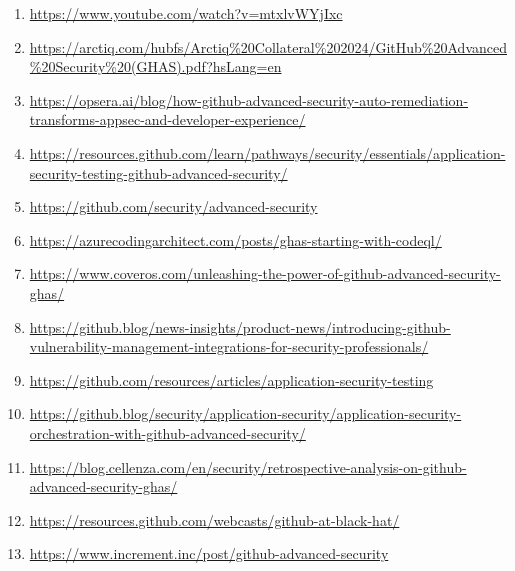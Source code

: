 \documentclass[11pt]{article}
\begin{document}
\begin{enumerate}[leftmargin=*]
  \item \url{https://www.youtube.com/watch?v=mtxlvWYjIxc}
  \item \url{https://arctiq.com/hubfs/Arctiq%20Collateral%202024/GitHub%20Advanced%20Security%20(GHAS).pdf?hsLang=en}
  \item \url{https://opsera.ai/blog/how-github-advanced-security-auto-remediation-transforms-appsec-and-developer-experience/}
  \item \url{https://resources.github.com/learn/pathways/security/essentials/application-security-testing-github-advanced-security/}
  \item \url{https://github.com/security/advanced-security}
  \item \url{https://azurecodingarchitect.com/posts/ghas-starting-with-codeql/}
  \item \url{https://www.coveros.com/unleashing-the-power-of-github-advanced-security-ghas/}
  \item \url{https://github.blog/news-insights/product-news/introducing-github-vulnerability-management-integrations-for-security-professionals/}
  \item \url{https://github.com/resources/articles/application-security-testing}
  \item \url{https://github.blog/security/application-security/application-security-orchestration-with-github-advanced-security/}
  \item \url{https://blog.cellenza.com/en/security/retrospective-analysis-on-github-advanced-security-ghas/}
  \item \url{https://resources.github.com/webcasts/github-at-black-hat/}
  \item \url{https://www.increment.inc/post/github-advanced-security}
\end{enumerate}
\end{document}

